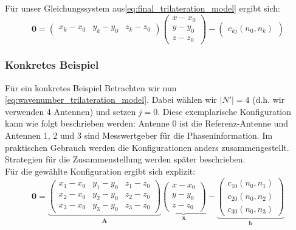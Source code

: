 {%
Für unser Gleichungssystem aus\eqref{eq:final_trilateration_model} ergibt sich:
%
\begin{equation}\label{eq:wavenumber_trilateration_model}
\mathbf{0}=
\left(
	\begin{array}{ccc}
		x_k-x_0 & y_k-y_0 & z_k-z_0 
	\end{array}
\right)
\left(
   \begin{array}{c}
	   x-x_0\\
	   y-y_0\\
	   z-z_0
   \end{array}
\right)
-
\left(
	\begin{array}{c}
		c_{kj}(n_0, n_k)
	\end{array}
\right)
\end{equation}
%
\subsubsection{Konkretes Beispiel}
%
Für ein konkretes Beispiel Betrachten wir nun \eqref{eq:wavenumber_trilateration_model}. Dabei wählen wir $|N'|=4$ (d.h. wir verwenden 4 Antennen) und setzen $j=0$. Diese exemplarische Konfiguration kann wie folgt beschrieben werden: Antenne 0 ist die Referenz-Antenne und Antennen 1, 2 und 3 sind Messwertgeber für die Phaseninformation. Im praktischen Gebrauch werden die Konfigurationen anders zusammengestellt. Strategien für die Zusammenstellung werden später beschrieben.\\
Für die gewählte Konfiguration ergibt sich explizit:
%
\begin{equation}\label{eq:wavenumber_trilateration_model_explicit}
\mathbf{0}=
\underbrace{\left(
	\begin{array}{ccc}
		x_1-x_0 & y_1-y_0 & z_1-z_0 \\
		x_2-x_0 & y_2-y_0 & z_2-z_0 \\
		x_3-x_0 & y_3-y_0 & z_3-z_0 
	\end{array}
\right)}_{\textbf{A}}
\underbrace{\left(
   \begin{array}{c}
	   x-x_0\\
	   y-y_0\\
	   z-z_0
   \end{array}
\right)}_{\textbf{x}}
-
\underbrace{\left(
	\begin{array}{c}
		c_{10}(n_0, n_1) \\
		c_{20}(n_0, n_2) \\
		c_{30}(n_0, n_3)
	\end{array}
\right)}_{\textbf{b}}
\end{equation}
}
